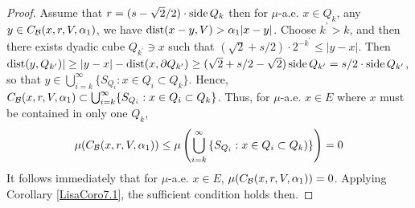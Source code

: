 \begin{proof}
    {\color{red}Assume that $r= (s-\sqrt{2}/2)\cdot \operatorname{side} Q_k$ then for $\mu$-a.e. $x\in Q_k$, any $y\in C_\mathcal B(x,r, V, \alpha_1)$, we have $\operatorname{dist}(x-y,V)>\alpha_1|x-y|$. Choose $k^\prime > k$, and then there exists dyadic cube $Q_{k^\prime}\ni x$ such that $(\sqrt{2}+s/2)\cdot 2^{-k^\prime} \leq |y-x|$. Then $\operatorname{dist}(y, Q_{k^\prime})|\geq |y-x|-\operatorname{dist}(x, \partial Q_{k^\prime})\geq (\sqrt{2} +s/2-\sqrt{2})\operatorname{side} Q_{k^\prime} = s/2\cdot\operatorname{side} Q_{k^\prime}$, so that $y\in \bigcup_{i=k}^\infty \{S_{Q_i}: x\in Q_i\subset Q_k\}$.}
    Hence, $C_\mathcal B(x, r, V, \alpha_1)\subset \bigcup_{i=k}^\infty \{S_{Q_i}: x\in Q_i\subset Q_k\}$. Thus, for $\mu$-a.e. $x\in E$ where $x$ must be contained in only one $Q_k$,
    \begin{equation*}
        \begin{split}
            \mu(C_\mathcal B(x, r, V, \alpha_1))\leq \mu\left( \bigcup_{i=k}^\infty \left\{S_{Q_i}:x\in Q_i\subset Q_k \right)\}\right) = 0
        \end{split}
    \end{equation*}
    It follows immediately that for $\mu$-a.e. $x\in E$, $\mu(C_\mathcal B(x, r, V, \alpha_1)) = 0$. Applying Corollary \ref{LisaCoro7.1}, the sufficient condition holds then.


\end{proof}
